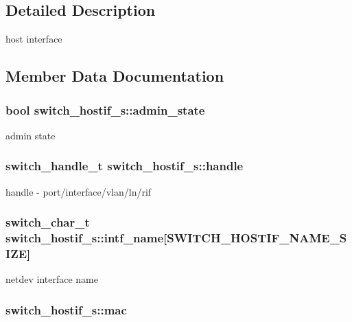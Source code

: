\subsection{Detailed Description}
host interface 

\subsection{Member Data Documentation}
\hypertarget{structswitch__hostif__s_a3445a3283b1c3e9fea8082e18db4ebcb}{
\subsubsection[{admin\+\_\+state}]{\setlength{\rightskip}{0pt plus 5cm}bool switch\+\_\+hostif\+\_\+s\+::admin\+\_\+state}}\label{structswitch__hostif__s_a3445a3283b1c3e9fea8082e18db4ebcb}
admin state \hypertarget{structswitch__hostif__s_ac489a29fc7f506ec2dc9b80db51314cb}{
\subsubsection[{handle}]{\setlength{\rightskip}{0pt plus 5cm}switch\+\_\+handle\+\_\+t switch\+\_\+hostif\+\_\+s\+::handle}}\label{structswitch__hostif__s_ac489a29fc7f506ec2dc9b80db51314cb}
handle -\/ port/interface/vlan/ln/rif \hypertarget{structswitch__hostif__s_a6abf2c4fa1e9b2d265bab4ee6cc99518}{
\subsubsection[{intf\+\_\+name}]{\setlength{\rightskip}{0pt plus 5cm}switch\+\_\+char\+\_\+t switch\+\_\+hostif\+\_\+s\+::intf\+\_\+name\mbox{[}S\+W\+I\+T\+C\+H\+\_\+\+H\+O\+S\+T\+I\+F\+\_\+\+N\+A\+M\+E\+\_\+\+S\+I\+Z\+E\mbox{]}}}\label{structswitch__hostif__s_a6abf2c4fa1e9b2d265bab4ee6cc99518}
netdev interface name \hypertarget{structswitch__hostif__s_a88e9c77b0f1e2909f1be989ab2e23e8a}{
\subsubsection[{mac}]{ switch\+\_\+hostif\+\_\+s\+::mac}}\label{structswitch__hostif__s_a88e9c77b0f1e2909f1be989ab2e23e8a}
